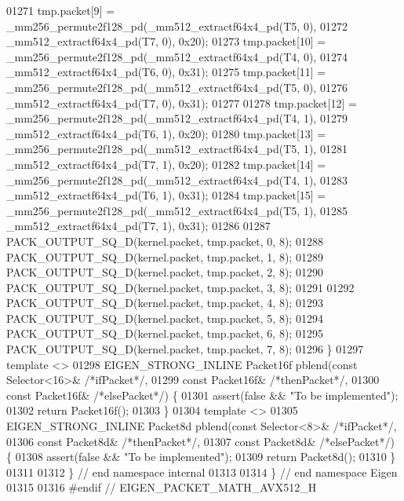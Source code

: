 \begin{DoxyCode}
01271   tmp.packet[9] = \_mm256\_permute2f128\_pd(\_mm512\_extractf64x4\_pd(T5, 0),
01272                                          \_mm512\_extractf64x4\_pd(T7, 0), 0x20);
01273   tmp.packet[10] = \_mm256\_permute2f128\_pd(\_mm512\_extractf64x4\_pd(T4, 0),
01274                                           \_mm512\_extractf64x4\_pd(T6, 0), 0x31);
01275   tmp.packet[11] = \_mm256\_permute2f128\_pd(\_mm512\_extractf64x4\_pd(T5, 0),
01276                                           \_mm512\_extractf64x4\_pd(T7, 0), 0x31);
01277 
01278   tmp.packet[12] = \_mm256\_permute2f128\_pd(\_mm512\_extractf64x4\_pd(T4, 1),
01279                                           \_mm512\_extractf64x4\_pd(T6, 1), 0x20);
01280   tmp.packet[13] = \_mm256\_permute2f128\_pd(\_mm512\_extractf64x4\_pd(T5, 1),
01281                                           \_mm512\_extractf64x4\_pd(T7, 1), 0x20);
01282   tmp.packet[14] = \_mm256\_permute2f128\_pd(\_mm512\_extractf64x4\_pd(T4, 1),
01283                                           \_mm512\_extractf64x4\_pd(T6, 1), 0x31);
01284   tmp.packet[15] = \_mm256\_permute2f128\_pd(\_mm512\_extractf64x4\_pd(T5, 1),
01285                                           \_mm512\_extractf64x4\_pd(T7, 1), 0x31);
01286 
01287   PACK\_OUTPUT\_SQ\_D(kernel.packet, tmp.packet, 0, 8);
01288   PACK\_OUTPUT\_SQ\_D(kernel.packet, tmp.packet, 1, 8);
01289   PACK\_OUTPUT\_SQ\_D(kernel.packet, tmp.packet, 2, 8);
01290   PACK\_OUTPUT\_SQ\_D(kernel.packet, tmp.packet, 3, 8);
01291 
01292   PACK\_OUTPUT\_SQ\_D(kernel.packet, tmp.packet, 4, 8);
01293   PACK\_OUTPUT\_SQ\_D(kernel.packet, tmp.packet, 5, 8);
01294   PACK\_OUTPUT\_SQ\_D(kernel.packet, tmp.packet, 6, 8);
01295   PACK\_OUTPUT\_SQ\_D(kernel.packet, tmp.packet, 7, 8);
01296 \}
01297 \textcolor{keyword}{template} <>
01298 EIGEN\_STRONG\_INLINE Packet16f pblend(\textcolor{keyword}{const} Selector<16>& \textcolor{comment}{/*ifPacket*/},
01299                                      \textcolor{keyword}{const} Packet16f& \textcolor{comment}{/*thenPacket*/},
01300                                      \textcolor{keyword}{const} Packet16f& \textcolor{comment}{/*elsePacket*/}) \{
01301   assert(\textcolor{keyword}{false} && \textcolor{stringliteral}{"To be implemented"});
01302   \textcolor{keywordflow}{return} Packet16f();
01303 \}
01304 \textcolor{keyword}{template} <>
01305 EIGEN\_STRONG\_INLINE Packet8d pblend(\textcolor{keyword}{const} Selector<8>& \textcolor{comment}{/*ifPacket*/},
01306                                     \textcolor{keyword}{const} Packet8d& \textcolor{comment}{/*thenPacket*/},
01307                                     \textcolor{keyword}{const} Packet8d& \textcolor{comment}{/*elsePacket*/}) \{
01308   assert(\textcolor{keyword}{false} && \textcolor{stringliteral}{"To be implemented"});
01309   \textcolor{keywordflow}{return} Packet8d();
01310 \}
01311 
01312 \} \textcolor{comment}{// end namespace internal}
01313 
01314 \} \textcolor{comment}{// end namespace Eigen}
01315 
01316 \textcolor{preprocessor}{#endif // EIGEN\_PACKET\_MATH\_AVX512\_H}
\end{DoxyCode}
